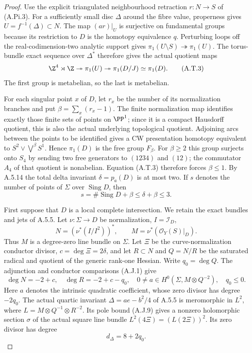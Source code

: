 \begin{proof}
Use the explicit triangulated neighbourhood retraction
$r:N\to S$ of (A.Pi.3). For a sufficiently small disc
$\Delta$ around the fibre value, properness gives
$U=f^{-1}(\Delta)\subset N$. The map $(ar)|_U$ is
surjective on fundamental groups because its restriction
to $D$ is the homotopy equivalence $q$. Perturbing loops
off the real-codimension-two analytic support gives
$\pi_1(U\setminus S)\twoheadrightarrow\pi_1(U)$.
The torus-bundle exact sequence over $\Delta^*$ therefore
gives the actual quotient maps
\[
 \Z^4\rtimes\Z\twoheadrightarrow\pi_1(U)
       \twoheadrightarrow\pi_1(D/J)\simeq\pi_1(D).
                                                        \tag{A.T.3}
\]
The first group is metabelian, so the last is metabelian.

For each singular point $x$ of $D$, let $r_x$ be the
number of its normalization branches and put
$\beta=\sum_x(r_x-1)$. The finite normalization map
identifies exactly those finite sets of points on
$\PP^1$; since it is a compact Hausdorff quotient,
this is also the actual underlying topological quotient.
Adjoining arcs between the points to be identified
gives a CW presentation homotopy equivalent to
$S^2\vee\bigvee^\beta S^1$. Hence
$\pi_1(D)$ is the free group $F_\beta$.
For $\beta\ge2$ this group surjects onto $S_4$ by
sending two free generators to $(1234)$ and $(12)$;
the commutator $A_4$ of that quotient is nonabelian.
Equation (A.T.3) therefore forces $\beta\le1$.
By A.5.14 the total delta invariant $\delta=p_a(D)$
is at most two. If $s$ denotes the number of points
of $\Sigma$ over $\operatorname{Sing}D$, then
\[
 s=\#\operatorname{Sing}D+\beta\le\delta+\beta\le3.
                                                        \tag{A.T.4}
\]

First suppose that $D$ is a local complete intersection.
We retain the exact bundles and jets of A.5.5.
Let $\nu:\Sigma\to D$ be normalization, $I=\mathcal I_D$,
\[
 N=(\nu^*(I/I^2))^*,\qquad
 M=\nu^*(\mathcal O_Y(S)|_D).
\]
Thus $M$ is a degree-zero line bundle on $\Sigma$.
Let $\Xi$ be the curve-normalization
conductor divisor, $c=\deg\Xi=2\delta$, and let
$R\subset N$ and $Q=N/R$ be the saturated radical and
quotient of the generic rank-one Hessian. Write
$q_0=\deg Q$. The adjunction and conductor comparisons
(A.J.1) give
\[
 \deg N=-2+c,\quad \deg R=-2+c-q_0,\quad
 0\ne a\in H^0(\Sigma,M\otimes Q^{-2}),\quad q_0\le0.
                                                        \tag{A.T.5}
\]
Here $a$ denotes the intrinsic quadratic coefficient,
whose zero divisor has degree $-2q_0$.
The actual quartic invariant $\Delta=ae-b^2/4$ of
A.5.5 is meromorphic in
$L^2$, where $L=M\otimes Q^{-1}\otimes R^{-2}$.
Its pole bound (A.J.9) gives a nonzero holomorphic
section $\sigma$ of the actual square line bundle
$L^2(4\Xi)=(L(2\Xi))^2$. Its zero divisor has degree
\[
               d_\Delta=8+2q_0.                    \tag{A.T.6}
\]


\end{proof}
